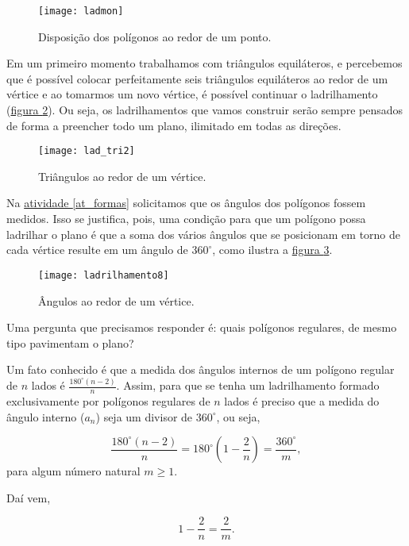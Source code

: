 \begin{figure}[H]
\centering
\texttt{[image: ladmon]}
\caption{Disposição dos polígonos ao redor de um ponto.}
\label{lad_reg}
\end{figure}

Em um primeiro momento trabalhamos com triângulos equiláteros, e percebemos que é possível colocar perfeitamente seis triângulos equiláteros ao redor de um vértice e ao tomarmos um novo vértice, é possível continuar o ladrilhamento (\hyperref[ladr_tri2]{figura \ref{ladr_tri2}}). Ou seja,  os ladrilhamentos que vamos construir serão sempre pensados de forma a preencher todo um plano, ilimitado em todas as direções. 

\begin{figure}[H]
\centering
\texttt{[image: lad\_tri2]}
\caption{Triângulos ao redor de um vértice.}
\label{ladr_tri2}
\end{figure}
 
 
Na \hyperref[at_formas]{atividade \ref{at_formas}} solicitamos que os ângulos dos polígonos fossem medidos. Isso se justifica, pois, uma condição para que um polígono possa ladrilhar o plano é que a soma dos vários ângulos que se posicionam em torno de cada vértice resulte em um ângulo de $360 ^{\circ}$, como ilustra a \hyperref[angulos]{figura \ref{angulos}}.

\begin{figure}[H]
\centering
\texttt{[image: ladrilhamento8]}
\caption{Ângulos ao redor de um vértice.}
\label{angulos}
\end{figure}


Uma pergunta que precisamos responder é:  quais polígonos regulares, de mesmo tipo pavimentam o plano?

Um fato conhecido é que a medida dos ângulos internos de um polígono regular de $n$ lados é $\displaystyle \frac{180^{\circ}(n-2)}{n}$. Assim, para que se tenha um ladrilhamento formado exclusivamente por polígonos regulares de $n$ lados é preciso que a medida do ângulo interno ($a_n$) seja um divisor de $360^{\circ}$, ou seja,

\begin{equation*}
\frac{180^{\circ}(n-2)}{n}=180^{\circ} \left(1 - \frac{2}{n}\right)=\frac{360^{\circ}}{m},
\end{equation*}
para algum número natural $m\geq1$.

Daí vem,

\begin{equation*}
1-\frac{2}{n}=\frac{2}{m}.
\end{equation*}

